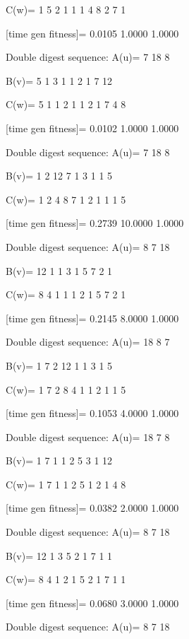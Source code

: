 C(w)=
     1     5     2     1     1     1     4     8     2     7     1

[time gen fitness]=
    0.0105    1.0000    1.0000

Double digest sequence:
A(u)=
     7    18     8

B(v)=
     5     1     3     1     1     2     1     7    12

C(w)=
     5     1     1     2     1     1     2     1     7     4     8

[time gen fitness]=
    0.0102    1.0000    1.0000

Double digest sequence:
A(u)=
     7    18     8

B(v)=
     1     2    12     7     1     3     1     1     5

C(w)=
     1     2     4     8     7     1     2     1     1     1     5

[time gen fitness]=
    0.2739   10.0000    1.0000

Double digest sequence:
A(u)=
     8     7    18

B(v)=
    12     1     1     3     1     5     7     2     1

C(w)=
     8     4     1     1     1     2     1     5     7     2     1

[time gen fitness]=
    0.2145    8.0000    1.0000

Double digest sequence:
A(u)=
    18     8     7

B(v)=
     1     7     2    12     1     1     3     1     5

C(w)=
     1     7     2     8     4     1     1     2     1     1     5

[time gen fitness]=
    0.1053    4.0000    1.0000

Double digest sequence:
A(u)=
    18     7     8

B(v)=
     1     7     1     1     2     5     3     1    12

C(w)=
     1     7     1     1     2     5     1     2     1     4     8

[time gen fitness]=
    0.0382    2.0000    1.0000

Double digest sequence:
A(u)=
     8     7    18

B(v)=
    12     1     3     5     2     1     7     1     1

C(w)=
     8     4     1     2     1     5     2     1     7     1     1

[time gen fitness]=
    0.0680    3.0000    1.0000

Double digest sequence:
A(u)=
     8     7    18

